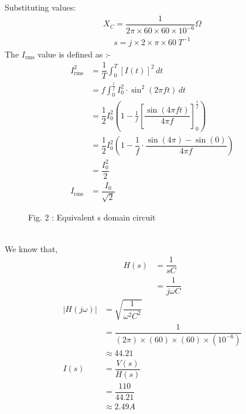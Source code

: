 \documentclass[journal,12pt,twocolumn]{IEEEtran}
\theoremstyle{remark}
\begin{document}
Substituting values: \\
\begin {align}
X_C = \dfrac{1}{2\pi \times 60 \times 60 \times 10^{-6}} \Omega
\end{align}
\begin {align}
s=j\times2\times\pi\times60 \: T^{-1}
\end{align}
The $I_{\text{rms}}$ value is defined as :-
\begin{align}
I_{\text{rms}}^2 &= {\dfrac{1}{T} \int_{0}^{T} [I(t)]^2 \, dt} \\
&= {f \int_{0}^{\frac{1}{f}} I_{\text{0}}^2 \cdot \sin^2(2\pi ft) \, dt} \\
&= \dfrac{1}{2} I_{0}^2 \left(1 - \frac{1}{f}\left[\dfrac{\sin(4\pi ft )}{4\pi f}\right]_{0}^{\frac{1}{f}}\right) \\
&= \dfrac{1}{2} I_{0}^2 \left(1 - \dfrac{1}{f} \cdot \dfrac{\sin\left(4\pi \right) - \sin(0 )}{4\pi f}\right) \\
&= \dfrac{I_{0}^2}{2} \\
I_{\text{rms}}&=\dfrac{I_{0}}{\sqrt{2}}
\end{align}
\begin{figure}[htbp]
 \centering
    
    \caption*{Fig. 2 : Equivalent s domain circuit}
    \label{fig:enter-label}
\end{figure} \\
We know that,
\begin{align}
 H(s)&= \dfrac{1}{sC}\\
&=\dfrac{1}{j \omega C}
\end{align}
\begin{align}
 |H(j \omega)| &= \sqrt{ \dfrac{1}{\omega^2 C^2}}\\
 &= \dfrac{1}{{ (2\pi) \times(60)\times(60) \times (10^{-6})}}\\
&\approx 44.21\\
I(s) &= \dfrac{V(s)}{H(s)} \\
&=\dfrac{110}{44.21} \\
&\approx 2.49  A
\end{align}
\end{document}
